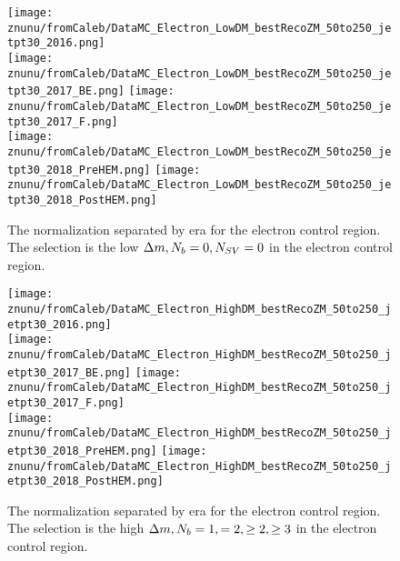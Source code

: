 \begin{figure}[!h]
	\begin{center}
    \texttt{[image: znunu/fromCaleb/DataMC\_Electron\_LowDM\_bestRecoZM\_50to250\_jetpt30\_2016.png]} \\
    \texttt{[image: znunu/fromCaleb/DataMC\_Electron\_LowDM\_bestRecoZM\_50to250\_jetpt30\_2017\_BE.png]} 
    \texttt{[image: znunu/fromCaleb/DataMC\_Electron\_LowDM\_bestRecoZM\_50to250\_jetpt30\_2017\_F.png]} \\
    \texttt{[image: znunu/fromCaleb/DataMC\_Electron\_LowDM\_bestRecoZM\_50to250\_jetpt30\_2018\_PreHEM.png]}
    \texttt{[image: znunu/fromCaleb/DataMC\_Electron\_LowDM\_bestRecoZM\_50to250\_jetpt30\_2018\_PostHEM.png]} \\
	\end{center}
	\caption[\Znunu{} Normalization in Low \dm{} for Electronss]{The \Znunu{} normalization separated by era for the electron control region. The selection is the low $\Delta m, N_{b}=0, N_{SV}=0$ in the electron control region.
	 }
	\label{fig:znunu-norm-lm-electron}
\end{figure}

\begin{figure}[!h]
	\begin{center}
    \texttt{[image: znunu/fromCaleb/DataMC\_Electron\_HighDM\_bestRecoZM\_50to250\_jetpt30\_2016.png]} \\
    \texttt{[image: znunu/fromCaleb/DataMC\_Electron\_HighDM\_bestRecoZM\_50to250\_jetpt30\_2017\_BE.png]} 
    \texttt{[image: znunu/fromCaleb/DataMC\_Electron\_HighDM\_bestRecoZM\_50to250\_jetpt30\_2017\_F.png]} \\
    \texttt{[image: znunu/fromCaleb/DataMC\_Electron\_HighDM\_bestRecoZM\_50to250\_jetpt30\_2018\_PreHEM.png]}
    \texttt{[image: znunu/fromCaleb/DataMC\_Electron\_HighDM\_bestRecoZM\_50to250\_jetpt30\_2018\_PostHEM.png]} \\
	\end{center}
	\caption[\Znunu{} Normalization in High \dm{} for Electrons]{The \Znunu{} normalization separated by era for the electron control region. The selection is the high $\Delta m, N_{b}=1, =2, \geq2,\geq3$ in the electron control region.
	 }
	\label{fig:znunu-norm-hm-electron}
\end{figure}

